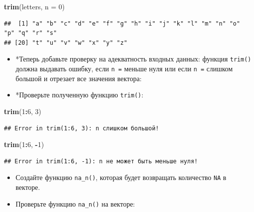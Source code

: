 \documentclass[]{book}
\newenvironment{Shaded}{\begin{snugshade}}{\end{snugshade}}
\newcommand{\KeywordTok}[1]{\textcolor[rgb]{0.13,0.29,0.53}{\textbf{#1}}}
\newcommand{\DataTypeTok}[1]{\textcolor[rgb]{0.13,0.29,0.53}{#1}}
\newcommand{\DecValTok}[1]{\textcolor[rgb]{0.00,0.00,0.81}{#1}}
\newcommand{\OperatorTok}[1]{\textcolor[rgb]{0.81,0.36,0.00}{\textbf{#1}}}
\newcommand{\NormalTok}[1]{#1}
\begin{document}
\begin{Shaded}
\begin{Highlighting}[]
\KeywordTok{trim}\NormalTok{(letters, }\DataTypeTok{n =} \DecValTok{0}\NormalTok{)}
\end{Highlighting}
\end{Shaded}

\begin{verbatim}
##  [1] "a" "b" "c" "d" "e" "f" "g" "h" "i" "j" "k" "l" "m" "n" "o" "p" "q" "r" "s"
## [20] "t" "u" "v" "w" "x" "y" "z"
\end{verbatim}

\begin{itemize}
\item
  *Теперь добавьте проверку на адекватность входных данных: функция
  \texttt{trim()} должна выдавать ошибку, если \texttt{n\ =} меньше нуля
  или если \texttt{n\ =} слишком большой и отрезает все значения
  вектора:
\item
  *Проверьте полученную функцию \texttt{trim()}:
\end{itemize}

\begin{Shaded}
\begin{Highlighting}[]
\KeywordTok{trim}\NormalTok{(}\DecValTok{1}\OperatorTok{:}\DecValTok{6}\NormalTok{, }\DecValTok{3}\NormalTok{)}
\end{Highlighting}
\end{Shaded}

\begin{verbatim}
## Error in trim(1:6, 3): n слишком большой!
\end{verbatim}

\begin{Shaded}
\begin{Highlighting}[]
\KeywordTok{trim}\NormalTok{(}\DecValTok{1}\OperatorTok{:}\DecValTok{6}\NormalTok{, }\OperatorTok{-}\DecValTok{1}\NormalTok{)}
\end{Highlighting}
\end{Shaded}

\begin{verbatim}
## Error in trim(1:6, -1): n не может быть меньше нуля!
\end{verbatim}

\begin{itemize}
\item
  Создайте функцию \texttt{na\_n()}, которая будет возвращать количество
  \texttt{NA} в векторе.
\item
  Проверьте функцию \texttt{na\_n()} на векторе:
\end{itemize}
\end{document}
